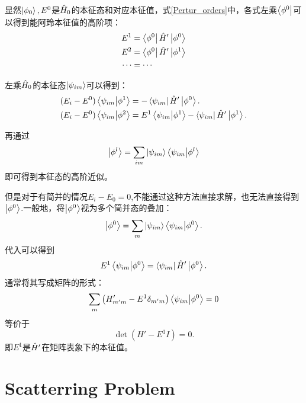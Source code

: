 显然$\left|\phi_0\right>,E^0$是$\hat{H}_0$的本征态和对应本征值，式\ref{Pertur_orders}中，各式左乘$\left<\phi^0\right|$可以得到能阿玲本征值的高阶项：
\begin{equation}
    \begin{aligned}
    E^1&=\left<\phi^0\right|\hat{H}'\left|\phi^0\right>\\
    E^2&=\left<\phi^0\right|\hat{H}'\left|\phi^1\right>\\
    \cdots&=\cdots
    \end{aligned}
\end{equation}

左乘$\hat{H}_0$的本征态$\left|\psi_{im}\right>$可以得到：
\begin{equation}
    \begin{aligned}
        (E_i-E^0)\left<\psi_{im}\middle|\phi^1\right>&=-\left<\psi_{im}\right|\hat{H}'\left|\phi^0\right>.\\
        (E_i-E^0)\left<\psi_{im}\middle|\phi^2\right>&=E^1\left<\psi_{im}\middle|\phi^1\right>-\left<\psi_{im}\right|\hat{H}'\left|\phi^1\right>.
    \end{aligned}
\end{equation}

再通过
\begin{equation}
    \left|\phi^l\right>=\sum_{im}\left|\psi_{im}\right>\left<\psi_{im}\middle|\phi^l\right>
\end{equation}
即可得到本征态的高阶近似。

但是对于有简并的情况$E_i-E_0=0$,不能通过这种方法直接求解，也无法直接得到$\left|\phi^0\right>$.一般地，将$\left|\phi^0\right>$视为多个简并态的叠加：
\begin{equation}
    \left|\phi^0\right>=\sum_{m}\left|\psi_{im}\right>\left<\psi_{im}\middle|\phi^0\right>.
\end{equation}
代入可以得到
\begin{equation}
    E^1\left<\psi_{im}\middle|\phi^0\right>=\left<\psi_{im}\right|\hat{H}'\left|\phi^0\right>.
\end{equation}
通常将其写成矩阵的形式：
\begin{equation}
    \sum_m\left(H'_{m'm}-E^1\delta_{m'm}\right)\left<\psi_{im}\middle|\phi^0\right>=0
\end{equation}
等价于
\begin{equation}
    \det\left(H'-E^1I\right)=0.
\end{equation}
即$E^1$是$\hat{H}'$在矩阵表象下的本征值。

\section{Scatterring Problem}


